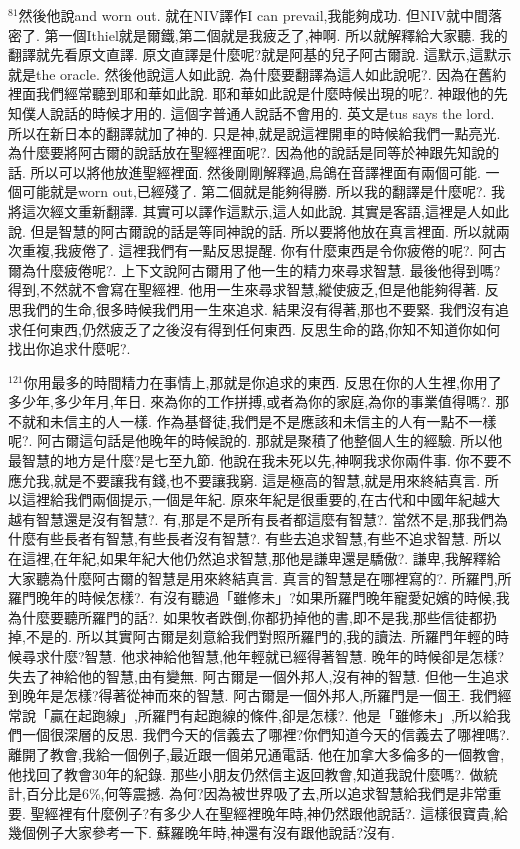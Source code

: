 \documentclass{book}
\begin{document}
$^{81}$然後他說and worn out.
就在NIV譯作I can prevail,我能夠成功.
但NIV就中間落密了.
第一個Ithiel就是爾鐵,第二個就是我疲乏了,神啊.
所以就解釋給大家聽.
我的翻譯就先看原文直譯.
原文直譯是什麼呢?就是阿基的兒子阿古爾說.
這默示,這默示就是the oracle.
然後他說這人如此說.
為什麼要翻譯為這人如此說呢?.
因為在舊約裡面我們經常聽到耶和華如此說.
耶和華如此說是什麼時候出現的呢?.
神跟他的先知僕人說話的時候才用的.
這個字普通人說話不會用的.
英文是tus says the lord.
所以在新日本的翻譯就加了神的.
只是神,就是說這裡開車的時候給我們一點亮光.
為什麼要將阿古爾的說話放在聖經裡面呢?.
因為他的說話是同等於神跟先知說的話.
所以可以將他放進聖經裡面.
然後剛剛解釋過,烏鴿在音譯裡面有兩個可能.
一個可能就是worn out,已經殘了.
第二個就是能夠得勝.
所以我的翻譯是什麼呢?.
我將這次經文重新翻譯.
其實可以譯作這默示,這人如此說.
其實是客語,這裡是人如此說.
但是智慧的阿古爾說的話是等同神說的話.
所以要將他放在真言裡面.
所以就兩次重複,我疲倦了.
這裡我們有一點反思提醒.
你有什麼東西是令你疲倦的呢?.
阿古爾為什麼疲倦呢?.
上下文說阿古爾用了他一生的精力來尋求智慧.
最後他得到嗎?得到,不然就不會寫在聖經裡.
他用一生來尋求智慧,縱使疲乏,但是他能夠得著.
反思我們的生命,很多時候我們用一生來追求.
結果沒有得著,那也不要緊.
我們沒有追求任何東西,仍然疲乏了之後沒有得到任何東西.
反思生命的路,你知不知道你如何找出你追求什麼呢?.

$^{121}$你用最多的時間精力在事情上,那就是你追求的東西.
反思在你的人生裡,你用了多少年,多少年月,年日.
來為你的工作拼搏,或者為你的家庭,為你的事業值得嗎?.
那不就和未信主的人一樣.
作為基督徒,我們是不是應該和未信主的人有一點不一樣呢?.
阿古爾這句話是他晚年的時候說的.
那就是聚積了他整個人生的經驗.
所以他最智慧的地方是什麼?是七至九節.
他說在我未死以先,神啊我求你兩件事.
你不要不應允我,就是不要讓我有錢,也不要讓我窮.
這是極高的智慧,就是用來終結真言.
所以這裡給我們兩個提示,一個是年紀.
原來年紀是很重要的,在古代和中國年紀越大越有智慧還是沒有智慧?.
有,那是不是所有長者都這麼有智慧?.
當然不是,那我們為什麼有些長者有智慧,有些長者沒有智慧?.
有些去追求智慧,有些不追求智慧.
所以在這裡,在年紀,如果年紀大他仍然追求智慧,那他是謙卑還是驕傲?.
謙卑,我解釋給大家聽為什麼阿古爾的智慧是用來終結真言.
真言的智慧是在哪裡寫的?.
所羅門,所羅門晚年的時候怎樣?.
有沒有聽過「雖修未」?如果所羅門晚年寵愛妃嬪的時候,我為什麼要聽所羅門的話?.
如果牧者跌倒,你都扔掉他的書,即不是我,那些信徒都扔掉,不是的.
所以其實阿古爾是刻意給我們對照所羅門的,我的讀法.
所羅門年輕的時候尋求什麼?智慧.
他求神給他智慧,他年輕就已經得著智慧.
晚年的時候卻是怎樣?失去了神給他的智慧,由有變無.
阿古爾是一個外邦人,沒有神的智慧.
但他一生追求到晚年是怎樣?得著從神而來的智慧.
阿古爾是一個外邦人,所羅門是一個王.
我們經常說「贏在起跑線」,所羅門有起跑線的條件,卻是怎樣?.
他是「雖修未」,所以給我們一個很深層的反思.
我們今天的信義去了哪裡?你們知道今天的信義去了哪裡嗎?.
離開了教會,我給一個例子,最近跟一個弟兄通電話.
他在加拿大多倫多的一個教會,他找回了教會30年的紀錄.
那些小朋友仍然信主返回教會,知道我說什麼嗎?.
做統計,百分比是6\%,何等震撼.
為何?因為被世界吸了去,所以追求智慧給我們是非常重要.
聖經裡有什麼例子?有多少人在聖經裡晚年時,神仍然跟他說話?.
這樣很寶貴,給幾個例子大家參考一下.
蘇羅晚年時,神還有沒有跟他說話?沒有.
\end{document}
